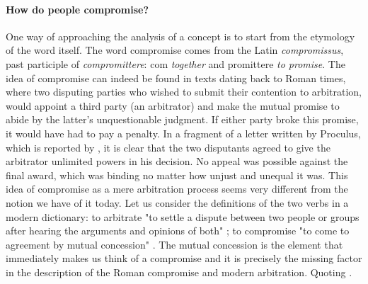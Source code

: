 \paragraph{How do people compromise?} 
One way of approaching the analysis of a concept is to start from the etymology of the word itself. The word compromise comes from the Latin \textit{compromissus}, past participle of \textit{compromittere}: com \textit{together} and promittere \textit{to promise}.
The idea of compromise can indeed be found in texts dating back to Roman times, where two disputing parties who wished to submit their contention to arbitration, would appoint a third party (an arbitrator) and make the mutual promise to abide by the latter's unquestionable judgment. If either party broke this promise, it would have had to pay a penalty.
In a fragment of a letter written by Proculus, which is reported by \citet[p.529]{Zimmermann1996}, it is clear that the two disputants agreed to give the arbitrator unlimited powers in his decision. No appeal was possible against the final award, which was binding no matter how unjust and unequal it was. This idea of compromise as a mere arbitration process seems very different from the notion we have of it today. Let us consider the definitions of the two verbs in a modern dictionary: to arbitrate "to settle a dispute between two people or groups after hearing the arguments and opinions of both" \citep{Arbitration}; to compromise "to come to agreement by mutual concession" \citep{Compromise}.
The mutual concession is the element that immediately makes us think of a compromise and it is precisely the missing factor in the description of the Roman compromise and modern arbitration. Quoting \citet{Braybrooke1982} .

